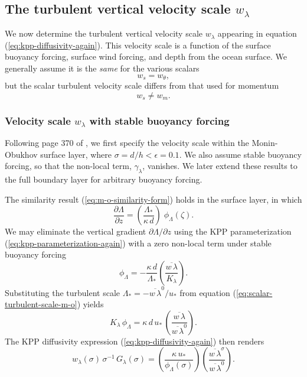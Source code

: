 \subsection{The turbulent vertical velocity scale $w_{\lambda}$} 
\label{subsection:vertical-velocity-scale}

We now determine the turbulent vertical velocity scale $w_{\lambda}$
appearing in equation (\ref{eq:kpp-diffusivity-again}).  This velocity
scale is a function of the surface buoyancy forcing, surface wind
forcing, and depth from the ocean surface.  We generally assume it is
the {\it same} for the various scalars
\begin{equation}
 w_{s} = w_{\theta}, 
\end{equation}
but the scalar turbulent velocity scale differs from that used for
momentum
\begin{equation}
 w_{s} \ne w_{m}. 
\end{equation}


\subsubsection{Velocity scale $w_{\lambda}$ with stable buoyancy forcing}

Following page 370 of \cite{LargeKPP}, we first specify the velocity
scale within the Monin-Obukhov surface layer, where $\sigma = d/h <
\epsilon = 0.1$.  We also assume stable buoyancy forcing, so that the
non-local term, $\gamma_{\lambda}$, vanishes.  We later extend these
results to the full boundary layer for arbitrary buoyancy forcing.

The similarity result (\ref{eq:m-o-similarity-form}) holds in the
surface layer, in which
\begin{equation}
  \frac{\partial \Lambda}{\partial z} = \left( \frac{\Lambda_{*}}{\kappa \, d} \right) \; \phi_{\Lambda}(\zeta).
\label{eq:m-o-similarity-form-again}
\end{equation}
We may eliminate the vertical gradient $\partial \Lambda/ \partial z$
using the KPP parameterization (\ref{eq:kpp-parameterization-again})
with a zero non-local term under stable buoyancy forcing
\begin{equation}
 \phi_{\Lambda} = -\frac{\kappa \, d}{\Lambda_{*}} \left( \frac{\overline{w \, \lambda}}{K_{\lambda}} \right).
\end{equation}
Substituting the turbulent scale $\Lambda_{*} =-\overline{w \,
  \lambda}^{0}/ u_{*}$ from equation
(\ref{eq:scalar-turbulent-scale-m-o}) yields
\begin{equation}
 K_{\lambda} \, \phi_{\Lambda} = \kappa \, d \, u_{*} \, \left( \frac{\overline{w \, \lambda}} {\overline{w \, \lambda}^{0} } \right).
\end{equation}
The KPP diffusivity expression (\ref{eq:kpp-diffusivity-again}) then
renders
\begin{equation}
 w_{\lambda}(\sigma) \, \sigma^{-1} \, G_{\lambda}(\sigma) = 
 \left(  \frac{\kappa \, u_{*}}{\phi_{\Lambda}(\sigma) }  \right) 
 \left( \frac{ \overline{w \, \lambda}^{\sigma}}{ \overline{w \, \lambda}^{0}}\right).
\end{equation}

